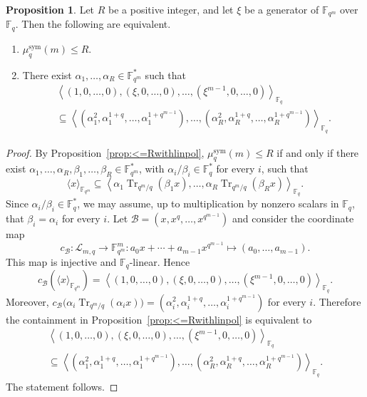 \documentclass[11pt,a4paper,reqno]{article}
\numberwithin{equation}{section}
\theoremstyle{definition}
\newtheorem{proposition}[theorem]{Proposition}
\renewcommand{\longrightarrow}{\to}
\begin{document}
\begin{proposition}\label{prop:linsymtensorrank}
Let \(R\) be a positive integer, and let \(\xi\) be a generator of
\(\mathbb F_{q^m}\) over \(\mathbb F_q\). Then the following are equivalent.
\begin{enumerate}
    \item \(\mu_q^{\mathrm{sym}}(m)\leq R\).
    \item There exist \(\alpha_1,\ldots,\alpha_R\in\mathbb F_{q^m}^{*}\) such that
    \begin{multline*}
        \left\langle
    (1,0,\ldots,0),(\xi,0,\ldots,0),\ldots,(\xi^{m-1},0,\ldots,0)
    \right\rangle_{\mathbb F_q}
   \\ \subseteq
    \left\langle
    (\alpha_1^2,\alpha_1^{1+q},\ldots,\alpha_1^{1+q^{m-1}}),
    \ldots,(\alpha_R^2,\alpha_R^{1+q},\ldots,\alpha_R^{1+q^{m-1}})
    \right\rangle_{\mathbb F_q}.
    \end{multline*}
\end{enumerate}
\end{proposition}
\begin{proof}
By Proposition~\ref{prop:<=Rwithlinpol}, \(\mu_q^{\mathrm{sym}}(m)\le R\) if and only if there exist
\(\alpha_1,\ldots,\alpha_R,\beta_1,\ldots,\beta_R\in\mathbb F_{q^m}^{*}\), with
\(\alpha_i/\beta_i\in\mathbb F_q^{*}\) for every \(i\), such that
\[
\langle x\rangle_{\mathbb F_{q^m}}
\subseteq
\left\langle
\alpha_1\operatorname{Tr}_{q^m/q}(\beta_1x),\ldots,
\alpha_R\operatorname{Tr}_{q^m/q}(\beta_Rx)
\right\rangle_{\mathbb F_q}.
\]
Since \(\alpha_i/\beta_i\in\mathbb F_q^{*}\), we may assume, up to multiplication by
nonzero scalars in \(\mathbb F_q\), that \(\beta_i=\alpha_i\) for every \(i\). Let $\mathcal B=(x,x^q,\ldots,x^{q^{m-1}})$ and consider the coordinate map
\[
c_{\mathcal B}:\mathcal{L}_{m,q}\longrightarrow \mathbb F_{q^m}^m:
a_0x+\cdots+a_{m-1}x^{q^{m-1}}
\longmapsto (a_0,\ldots,a_{m-1}).
\]
This map is injective and \(\mathbb F_q\)-linear. Hence
\[
c_{\mathcal B}(\langle x\rangle_{\mathbb F_{q^m}})
=
\left\langle
(1,0,\ldots,0),(\xi,0,\ldots,0),\ldots,
(\xi^{m-1},0,\ldots,0)
\right\rangle_{\mathbb F_q}.
\]
Moreover, $c_{\mathcal B}\big(\alpha_i\operatorname{Tr}_{q^m/q}(\alpha_i x)\big)
=
(\alpha_i^2,\alpha_i^{1+q},\ldots,\alpha_i^{1+q^{m-1}})$ for every \(i\). Therefore the containment in Proposition~\ref{prop:<=Rwithlinpol} is equivalent to
\begin{multline*}
\left\langle
(1,0,\ldots,0),(\xi,0,\ldots,0),\ldots,(\xi^{m-1},0,\ldots,0)
\right\rangle_{\mathbb F_q}\\
\subseteq
\left\langle
(\alpha_1^2,\alpha_1^{1+q},\ldots,\alpha_1^{1+q^{m-1}}),
\ldots,
(\alpha_R^2,\alpha_R^{1+q},\ldots,\alpha_R^{1+q^{m-1}})
\right\rangle_{\mathbb F_q}.
\end{multline*}
The statement follows.
\end{proof}
\end{document}
